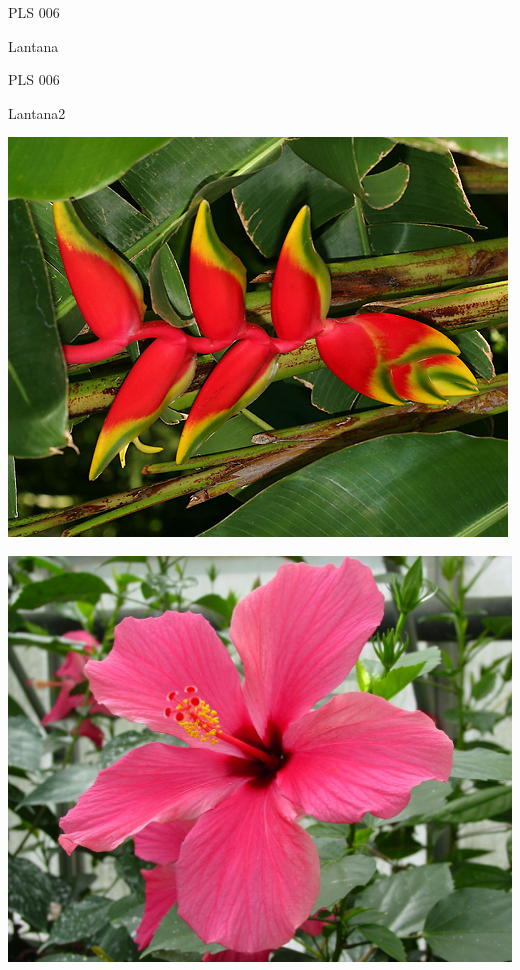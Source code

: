 \documentclass{article}
\begin{document}
\noindent  PLS 006
\vfill
\centerline{{\huge Lantana }}
\vfill
\newpage

\noindent  PLS 006
\vfill
\centerline{{\huge Lantana2 }}
\vfill
\newpage

\begin{center}
\includegraphics[height=0.925\paperheight]{../Heliconia_rostrata.jpg}
\end{center}
\newpage

\begin{center}
\includegraphics[height=0.925\paperheight]{../Hibiscus.jpg}
\end{center}
\newpage
\end{document}
